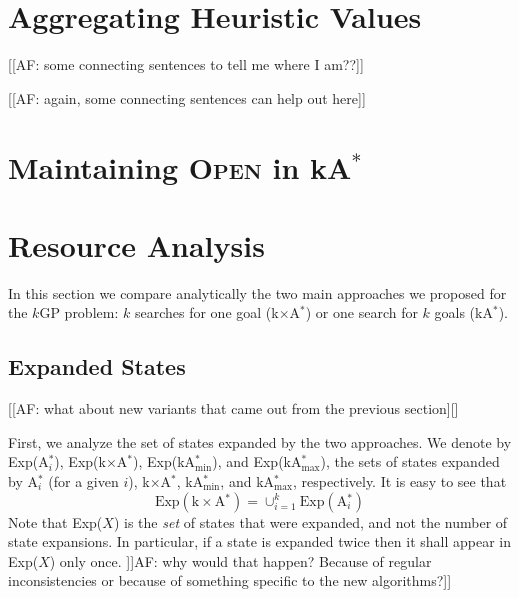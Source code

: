 \documentclass[twoside,11pt]{article}
\newcommand{\kgs}{$k$GP\xspace}
\newcommand{\kastar}{kA$^*$\xspace}
\newcommand{\kastarvar}[1]{\textup{kA}$^*_{#1}$\xspace}
\newcommand{\kastarmin}{\kastarvar{\min}}
\newcommand{\kastarmax}{\kastarvar{\max}}
\newcommand{\kxastar}{k$\times$A$^*$\xspace}
\newcommand{\astari}[1]{A$^*_{#1}$\xspace}
\newcommand{\open}{\textsc{Open}\xspace}
\begin{document}
\section{Aggregating Heuristic Values}
[[AF: some connecting sentences to tell me where I am??]]


[[AF: again, some connecting sentences can help out here]]




\section{Maintaining \open in \kastar}
\label{sec:lazy}




\section{Resource Analysis}
\label{sec:resource-analysis}

In this section we compare analytically the two main approaches we proposed for the \kgs problem: $k$ searches for one goal (\kxastar) or one search for $k$ goals (\kastar).

\subsection{Expanded States}
\label{sec:expandedStates}

[[AF: what about new variants that came out from the previous section][]

First, we analyze the set of states expanded by the two approaches.
We denote by Exp(\astari{i}), Exp(\kxastar), Exp(\kastarmin), and Exp(\kastarmax), the sets of states expanded by \astari{i} (for a given $i$), \kxastar, \kastarmin, and \kastarmax, respectively.
It is easy to see that
\begin{equation}
  \text{Exp}(\text{\kxastar})=\cup_{i=1}^k \text{Exp}(\text{\astari{i}})
\end{equation}
Note that Exp($X$) is the \emph{set} of states that were expanded, and not the number of state expansions.
In particular, if a state is expanded twice then it shall appear in Exp($X$) only once. ]]AF: why would that happen? Because of regular inconsistencies or because of something specific to the new algorithms?]]
\end{document}
